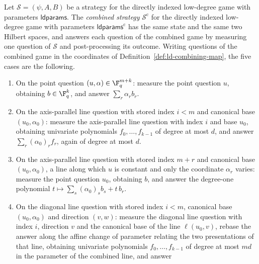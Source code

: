 \begin{definition}
	\label{def:ld-combined-strategy}
	\leanok
	Let $\mathcal S = (\psi, A, B)$ be a strategy for the directly indexed
	low-degree game with parameters $\mathsf{ldparams}$.  The
	\emph{combined strategy} $\mathcal S^{\mathrm c}$ for the directly indexed
	low-degree game with parameters $\mathsf{ldparams}^{\mathrm c}$ has the same
	state and the same two Hilbert spaces, and answers each question of the
	combined game by measuring one question of $\mathcal S$ and post-processing
	its outcome.  Writing questions of the combined game in the coordinates of
	Definition~\ref{def:ld-combining-map}, the five cases are the following.
	\begin{enumerate}
		\item On the point question $(u,\alpha) \in \F_q^{m+k}$: measure the
		point question $u$, obtaining $b \in \F_q^k$, and answer
		$\sum_r \alpha_r b_r$.
		\item On the axis-parallel line question with stored index $i < m$ and
		canonical base $(u_0,\alpha_0)$: measure the axis-parallel line question
		with index $i$ and base $u_0$, obtaining univariate polynomials
		$f_0,\ldots,f_{k-1}$ of degree at most $d$, and answer
		$\sum_r (\alpha_0)_r f_r$, again of degree at most $d$.
		\item On the axis-parallel line question with stored index $m + r$ and
		canonical base $(u_0,\alpha_0)$, a line along which $u$ is constant and
		only the coordinate $\alpha_r$ varies: measure the point question $u_0$,
		obtaining $b$, and answer the degree-one polynomial
		$t \mapsto \sum_s (\alpha_0)_s b_s + t\, b_r$.
		\item On the diagonal line question with stored index $i < m$, canonical
		base $(u_0,\alpha_0)$ and direction $(v,w)$: measure the diagonal line
		question with index $i$, direction $v$ and the canonical base of the
		line $\ell(u_0, v)$, rebase the answer along the affine change of
		parameter relating the two presentations of that line, obtaining
		univariate polynomials $f_0,\ldots,f_{k-1}$ of degree at most $md$ in the
		parameter of the combined line, and answer

\end{enumerate}
\end{definition}

